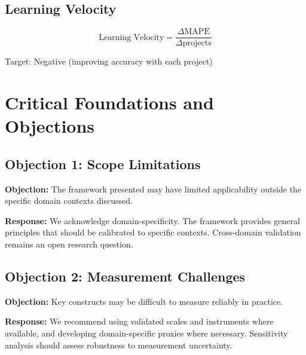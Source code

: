 \subsection{Learning Velocity}

\begin{equation}
\text{Learning Velocity} = \frac{\Delta \text{MAPE}}{\Delta \text{projects}}
\end{equation}

Target: Negative (improving accuracy with each project)


\section{Critical Foundations and Objections}
\label{sec:trk-foundations}

\subsection{Objection 1: Scope Limitations}

\textbf{Objection:} The framework presented may have limited applicability
outside the specific domain contexts discussed.

\textbf{Response:} We acknowledge domain-specificity. The framework provides
general principles that should be calibrated to specific contexts. Cross-domain
validation remains an open research question.

\subsection{Objection 2: Measurement Challenges}

\textbf{Objection:} Key constructs may be difficult to measure reliably in
practice.

\textbf{Response:} We recommend using validated scales and instruments where
available, and developing domain-specific proxies where necessary. Sensitivity
analysis should assess robustness to measurement uncertainty.



